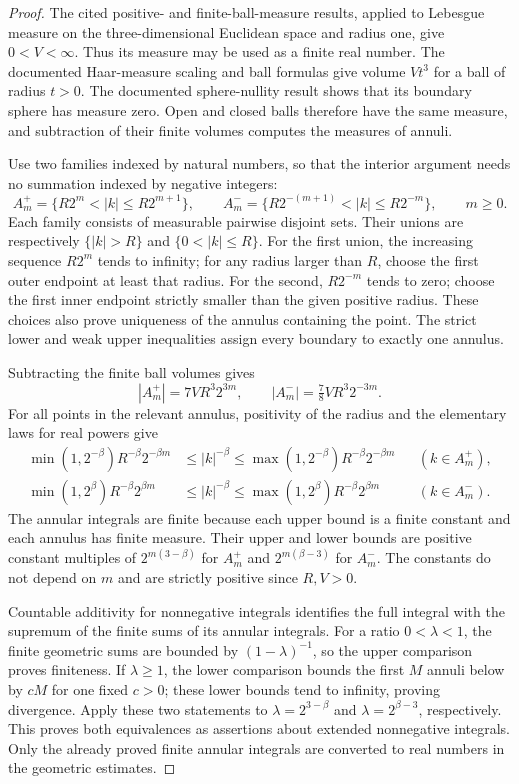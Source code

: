 \documentclass[11pt,a4paper]{article}
\theoremstyle{definition}
\theoremstyle{remark}
\begin{document}
\begin{proof}
The cited positive- and finite-ball-measure results, applied to
Lebesgue measure on the three-dimensional Euclidean space and radius
one, give $0<V<\infty$. Thus its measure may be used as a finite real
number. The documented Haar-measure scaling and ball formulas give volume
$Vt^3$ for a ball of radius $t>0$. The documented sphere-nullity result
shows that its boundary sphere has measure zero. Open and closed balls
therefore have the same measure, and subtraction of their finite
volumes computes the measures of annuli.

Use two families indexed by natural numbers, so that the interior
argument needs no summation indexed by negative integers:
\[
 A_m^+=\{R2^m<|k|\leq R2^{m+1}\},\qquad
 A_m^-=\{R2^{-(m+1)}<|k|\leq R2^{-m}\},\qquad m\geq0.
\]
Each family consists of measurable pairwise disjoint sets. Their unions
are respectively $\{|k|>R\}$ and $\{0<|k|\leq R\}$.
For the first union, the increasing sequence $R2^m$ tends to infinity;
for any radius larger than $R$, choose the first outer endpoint at
least that radius. For the second, $R2^{-m}$ tends to zero; choose
the first inner endpoint strictly smaller than the given positive
radius. These choices also prove uniqueness of the annulus containing
the point. The strict lower and weak upper inequalities assign every
boundary to exactly one annulus.

Subtracting the finite ball volumes gives
\[
 |A_m^+|=7VR^3 2^{3m},\qquad
 |A_m^-|=\tfrac78VR^3 2^{-3m}.
\]
For all points in the relevant annulus, positivity of the radius and
the elementary laws for real powers give
\begin{align*}
 \min(1,2^{-\beta})R^{-\beta}2^{-\beta m}
 &\leq |k|^{-\beta}\leq
 \max(1,2^{-\beta})R^{-\beta}2^{-\beta m}
       &&(k\in A_m^+),\\
 \min(1,2^{\beta})R^{-\beta}2^{\beta m}
 &\leq |k|^{-\beta}\leq
 \max(1,2^{\beta})R^{-\beta}2^{\beta m}
       &&(k\in A_m^-).
\end{align*}
The annular integrals are finite because each upper bound is a finite
constant and each annulus has finite measure. Their upper and lower
bounds are positive constant multiples of
$2^{m(3-\beta)}$ for $A_m^+$ and $2^{m(\beta-3)}$ for $A_m^-$.
The constants do not depend on $m$ and are strictly positive since
$R,V>0$.

Countable additivity for nonnegative integrals identifies the full
integral with the supremum of the finite sums of its annular integrals.
For a ratio $0<\lambda<1$, the finite geometric sums are bounded by
$(1-\lambda)^{-1}$, so the upper comparison proves finiteness. If
$\lambda\geq1$, the lower comparison bounds the first $M$ annuli
below by $cM$ for one fixed $c>0$; these lower bounds tend to infinity,
proving divergence. Apply these two statements to
$\lambda=2^{3-\beta}$ and $\lambda=2^{\beta-3}$, respectively.
This proves both equivalences as assertions about extended
nonnegative integrals. Only the already proved finite annular
integrals are converted to real numbers in the geometric estimates.


\end{proof}
\end{document}
